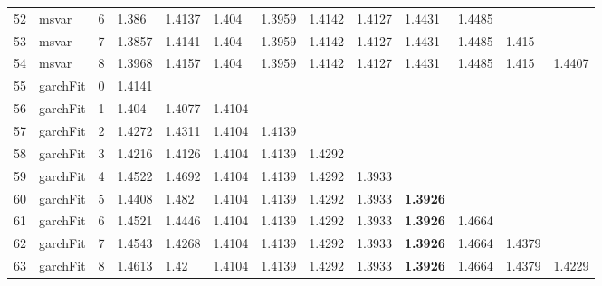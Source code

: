 \documentclass[10pt,a4paper]{article}
\begin{document}
\begin{table}[ht]
\begin{tabular}{rlrllllllllll}
  52 & msvar &     6 & 1.386 & 1.4137 & 1.404 & 1.3959 & 1.4142 & 1.4127 & 1.4431 & 1.4485 &  &  \\ 
  53 & msvar &     7 & 1.3857 & 1.4141 & 1.404 & 1.3959 & 1.4142 & 1.4127 & 1.4431 & 1.4485 & 1.415 &  \\ 
  54 & msvar &     8 & 1.3968 & 1.4157 & 1.404 & 1.3959 & 1.4142 & 1.4127 & 1.4431 & 1.4485 & 1.415 & 1.4407 \\ 
   \hline
55 & garchFit &     0 & 1.4141 &  &  &  &  &  &  &  &  &  \\ 
  56 & garchFit &     1 & 1.404 & 1.4077 & 1.4104 &  &  &  &  &  &  &  \\ 
  57 & garchFit &     2 & 1.4272 & 1.4311 & 1.4104 & 1.4139 &  &  &  &  &  &  \\ 
  58 & garchFit &     3 & 1.4216 & 1.4126 & 1.4104 & 1.4139 & 1.4292 &  &  &  &  &  \\ 
  59 & garchFit &     4 & 1.4522 & 1.4692 & 1.4104 & 1.4139 & 1.4292 & 1.3933 &  &  &  &  \\ 
  60 & garchFit &     5 & 1.4408 & 1.482 & 1.4104 & 1.4139 & 1.4292 & 1.3933 & \textbf{1.3926} &  &  &  \\ 
  61 & garchFit &     6 & 1.4521 & 1.4446 & 1.4104 & 1.4139 & 1.4292 & 1.3933 & \textbf{1.3926} & 1.4664 &  &  \\ 
  62 & garchFit &     7 & 1.4543 & 1.4268 & 1.4104 & 1.4139 & 1.4292 & 1.3933 & \textbf{1.3926} & 1.4664 & 1.4379 &  \\ 
  63 & garchFit &     8 & 1.4613 & 1.42 & 1.4104 & 1.4139 & 1.4292 & 1.3933 & \textbf{1.3926} & 1.4664 & 1.4379 & 1.4229 \\ 
   \hline
\end{tabular}
\end{table}
\end{document}
